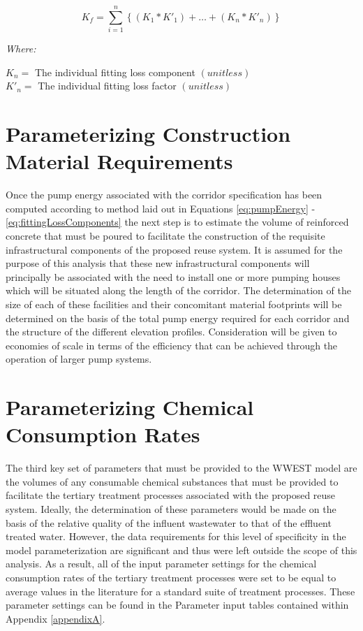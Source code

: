         \begin{equation}
            K_f = \sum\limits_{i=1}^n \left\{ (K_1 * K'_1) + \dots + (K_n * K'_n) \right\}
            \label{eq:fittingLossComponents}
        \end{equation}
    
       \noindent \textit{Where:} \hfill
       
       \begin{center}
           $K_n = $ The individual fitting loss component $(unitless)$ \\
           $K'_n = $ The individual fitting loss factor $(unitless)$ \\
       \end{center}
       
\section{Parameterizing Construction Material Requirements}

Once the pump energy associated with the corridor specification has been computed according to method laid out in Equations \ref{eq:pumpEnergy} - \ref{eq:fittingLossComponents} the next step is to estimate the volume of reinforced concrete that must be poured to facilitate the construction of the requisite infrastructural components of the proposed reuse system. It is assumed for the purpose of this analysis that these new infrastructural components will principally be associated with the need to install one or more pumping houses which will be situated along the length of the corridor. The determination of the size of each of these facilities and their concomitant material footprints will be determined on the basis of the total pump energy required for each corridor and the structure of the different elevation profiles. Consideration will be given to economies of scale in terms of the efficiency that can be achieved through the operation of larger pump systems.  
       
\section{Parameterizing Chemical Consumption Rates} 

The third key set of parameters that must be provided to the WWEST model are the volumes of any consumable chemical substances that must be provided to facilitate the tertiary treatment processes associated with the proposed reuse system. Ideally, the determination of these parameters would be made on the basis of the relative quality of the influent wastewater to that of the effluent treated water. However, the data requirements for this level of specificity in the model parameterization are significant and thus were left outside the scope of this analysis. As a result, all of the input parameter settings for the chemical consumption rates of the tertiary treatment processes were set to be equal to average values in the literature for a standard suite of treatment processes. These parameter settings can be found in the Parameter input tables contained within Appendix \ref{appendixA}.

